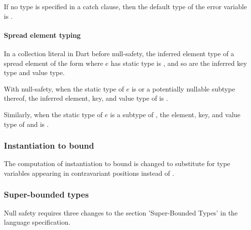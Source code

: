 \documentclass[makeidx]{article}
\begin{document}

If no type is specified in a catch clause, then the default type of the error
variable is .

\paragraph{Spread element typing}

In a collection literal in Dart before null-safety, the inferred element
type of a spread element of the form  where $e$ has static type
 is , and so are the inferred key type and value type.

With null-safety, when the static type of $e$ is  or a potentially
nullable subtype thereof, the inferred element, key, and value type
of  is .

Similarly, when the static type of $e$ is a subtype of ,
the element, key, and value type of  and  is .


\subsubsection{Instantiation to bound}

The computation of instantiation to bound is changed to substitute  for
type variables appearing in contravariant positions instead of .

\subsubsection{Super-bounded types}

Null safety requires three changes to the section 'Super-Bounded Types' in
the language specification.
\end{document}

